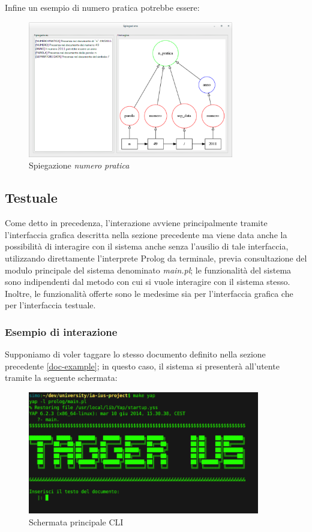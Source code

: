 Infine un esempio di numero pratica potrebbe essere:

\begin{figure}[H]
	\centering
	\includegraphics[width=0.8\textwidth]{img/interfaces/java-pratica.png}
	\caption[Schermata Java explain numero pratica]{Spiegazione \emph{numero pratica}}
	\label{java-pratica}
\end{figure}

\subsection{Testuale}
Come detto in precedenza, l’interazione avviene principalmente tramite l'interfaccia grafica descritta nella sezione precedente ma viene data anche la possibilità di interagire con il sistema anche senza l'ausilio di tale interfaccia, utilizzando direttamente l'interprete Prolog da terminale, previa consultazione del modulo principale del sistema denominato \emph{main.pl}; le funzionalità del sistema sono indipendenti dal metodo con cui si vuole interagire con il sistema stesso. Inoltre, le funzionalità offerte sono le medesime sia per l'interfaccia grafica che per l'interfaccia testuale.

\subsubsection{Esempio di interazione}
Supponiamo di voler taggare lo stesso documento definito nella sezione precedente \ref{doc-example}; in questo caso, il sistema si presenterà all'utente tramite la seguente schermata:

\begin{figure}[H]
	\centering
	\includegraphics[width=0.9\textwidth]{img/interfaces/CLI-main.png}
	\caption[Schermata CLI main]{Schermata principale CLI}
	\label{CLI-main}
\end{figure}

